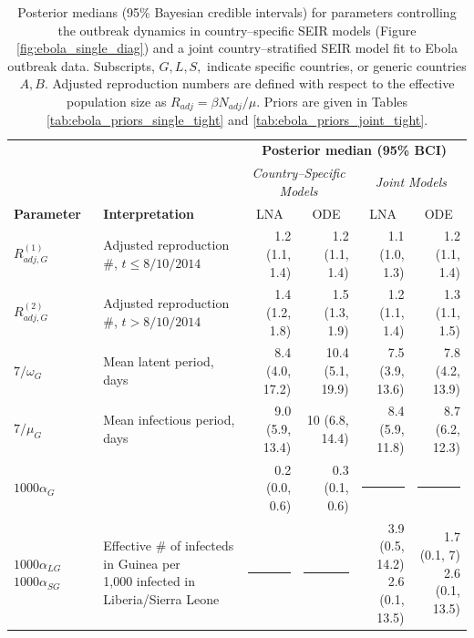 \begin{table}
	\caption[Posterior estimates of outbreak dynamics with country--specific and joint SEIR models fit Ebola outbreak data.]{Posterior medians (95\% Bayesian credible intervals) for parameters controlling the outbreak dynamics in country--specific SEIR models (Figure \ref{fig:ebola_single_diag}) and a joint country--stratified SEIR model fit to Ebola outbreak data. Subscripts, $ G,L,S, $ indicate specific countries, or generic countries $ A,B $. Adjusted reproduction numbers are defined with respect to the effective population size as $ R_{adj} = \beta N_{adj} /\mu $. Priors are given in Tables \ref{tab:ebola_priors_single_tight} and \ref{tab:ebola_priors_joint_tight}.}
	\label{tab:ebola_dynamic_ests}
	\centering\footnotesize
	\begin{tabular}{llrrrr}
		\hline
		& & \multicolumn{4}{c}{\textbf{Posterior median (95\% BCI)}}\\\cline{3-6}
		&& \multicolumn{2}{c}{\textit{Country--Specific Models}}& \multicolumn{2}{c}{\textit{Joint Models}} \\ 
		\cmidrule(r){3-4}\cmidrule(l){5-6}
		\textbf{Parameter} & \textbf{Interpretation} & \multicolumn{1}{c}{LNA}& \multicolumn{1}{c}{ODE} & \multicolumn{1}{c}{LNA} & \multicolumn{1}{c}{ODE}\\\hline
		$ R_{adj,G}^{(1)} $& Adjusted reproduction \#, $ t\leq 8/10/2014 $ & 1.2 (1.1, 1.4) & 1.2 (1.1, 1.4) & 1.1 (1.0, 1.3) & 1.2 (1.1, 1.4) \\ 
		$ R_{adj,G}^{(2)} $& Adjusted reproduction \#, $ t> 8/10/2014 $ & 1.4 (1.2, 1.8) & 1.5 (1.3, 1.9) & 1.2 (1.1, 1.4) & 1.3 (1.1, 1.5) \\
		$ 7/\omega_G $& Mean latent period, days & 8.4 (4.0, 17.2) & 10.4 (5.1, 19.9) & 7.5 (3.9, 13.6) & 7.8 (4.2, 13.9) \\ 
		$ 7/\mu_G $& Mean infectious period, days & 9.0 (5.9, 13.4) & 10 (6.8, 14.4) & 8.4 (5.9, 11.8) &  8.7 (6.2, 12.3) \\ 
		$ 1000\alpha_{G} $& \makecell[l]{Effective \# of baseline infecteds $ \times $ 1,000} & 0.2 (0.0, 0.6) & 0.3 (0.1, 0.6) & \rule[0.5ex]{0.75in}{0.5pt} & \rule[0.5ex]{0.75in}{0.5pt}\\
		\makecell[l]{$ 1000\alpha_{LG} $\\ $ 1000\alpha_{SG} $} & \makecell[l]{Effective \# of infecteds in Guinea per \\ \hspace{0.05in} 1,000 infected in Liberia/Sierra Leone} & \rule[0.5ex]{0.75in}{0.5pt} & \rule[0.5ex]{0.75in}{0.5pt} & \makecell[r]{3.9 (0.5, 14.2) \\ 2.6 (0.1, 13.5)} & \makecell[r]{1.7 (0.1, 7) \\ 2.6 (0.1, 13.5)} \\

\end{tabular}
\end{table}
